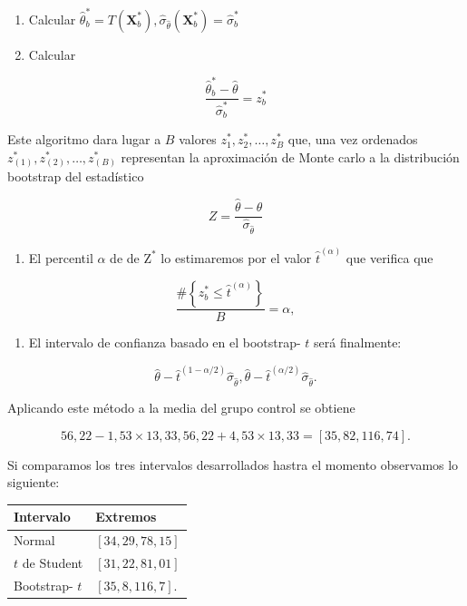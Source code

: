 \documentclass[
]{article}
\providecommand{\tightlist}{%
  \setlength{\itemsep}{0pt}\setlength{\parskip}{0pt}}
\begin{document}
\begin{enumerate}
\def\labelenumi{\alph{enumi})}
\tightlist
\item
  Calcular \(\hat{\theta}_{b}^{*}=T\left(\mathbf{X}_{b}^{*}\right), \widehat{\sigma}_{\hat{\theta}}\left(\mathbf{X}_{b}^{*}\right)=\widehat{\sigma}_{b}^{*}\)
\item
  Calcular
\end{enumerate}

\[
\frac{\hat{\theta}_{b}^{*}-\hat{\theta}}{\widehat{\sigma}_{b}^{*}}=z_{b}^{*}
\]

Este algoritmo dara lugar a \(B\) valores \(z_{1}^{*}, z_{2}^{*}, \ldots, z_{B}^{*}\) que, una vez ordenados \(z_{(1)}^{*}, z_{(2)}^{*}, \ldots, z_{(B)}^{*}\) representan la aproximación de Monte carlo a la distribución bootstrap del estadístico

\[
Z=\frac{\hat{\theta}-\theta}{\widehat{\sigma}_{\hat{\theta}}}
\]

\begin{enumerate}
\def\labelenumi{\arabic{enumi}.}
\setcounter{enumi}{3}
\tightlist
\item
  El percentil \(\alpha\) de de \(\mathrm{Z}^{*}\) lo estimaremos por el valor \(\hat{t}^{(\alpha)}\) que verifica que
\end{enumerate}

\[
\frac{\#\left\{z_{b}^{*} \leq \hat{t}^{(\alpha)}\right\}}{B}=\alpha,
\]

\begin{enumerate}
\def\labelenumi{\arabic{enumi}.}
\setcounter{enumi}{4}
\tightlist
\item
  El intervalo de confianza basado en el bootstrap- \(t\) será finalmente:
\end{enumerate}

\[
\hat{\theta}-\hat{t}^{(1-\alpha / 2)} \hat{\sigma}_{\hat{\theta}}, \hat{\theta}-\hat{t}^{(\alpha / 2)} \hat{\sigma}_{\hat{\theta}} .
\]

Aplicando este método a la media del grupo control se obtiene

\[
56,22-1,53 \times 13,33,56,22+4,53 \times 13,33=[35,82,116,74] .
\]

Si comparamos los tres intervalos desarrollados hastra el momento observamos lo siguiente:

\begin{longtable}[]{@{}ll@{}}
\toprule\noalign{}
Intervalo & Extremos \\
\midrule\noalign{}
\endhead
\bottomrule\noalign{}
\endlastfoot
Normal & \([34,29,78,15]\) \\
\(t\) de Student & \([31,22,81,01]\) \\
Bootstrap- \(t\) & \([35,8,116,7]\). \\
\end{longtable}
\end{document}
